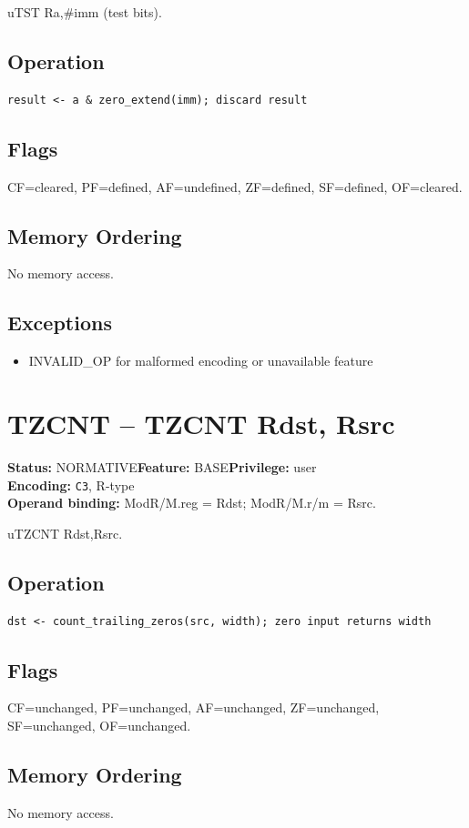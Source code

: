 \documentclass[10pt]{article}
\begin{document}
uTST Ra,\#imm (test bits).

\subsection*{Operation}
\begin{lstlisting}
result <- a & zero_extend(imm); discard result
\end{lstlisting}
\subsection*{Flags}
CF=cleared, PF=defined, AF=undefined, ZF=defined, SF=defined, OF=cleared.
\subsection*{Memory Ordering}
No memory access.
\subsection*{Exceptions}
\begin{itemize}
\item INVALID\_OP for malformed encoding or unavailable feature
\end{itemize}
\clearpage

\section{TZCNT -- TZCNT Rdst, Rsrc}
\textbf{Status:} NORMATIVE\quad \textbf{Feature:} BASE\quad \textbf{Privilege:} user\\
\textbf{Encoding:} \texttt{C3}, R-type\\
\textbf{Operand binding:} ModR/M.reg = Rdst; ModR/M.r/m = Rsrc.

uTZCNT Rdst,Rsrc.

\subsection*{Operation}
\begin{lstlisting}
dst <- count_trailing_zeros(src, width); zero input returns width
\end{lstlisting}
\subsection*{Flags}
CF=unchanged, PF=unchanged, AF=unchanged, ZF=unchanged, SF=unchanged, OF=unchanged.
\subsection*{Memory Ordering}
No memory access.
\end{document}
